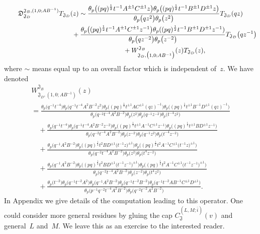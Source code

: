 \documentclass[a4paper,12pt]{article}
\begin{document}
\begin{gather}
{\mathfrak D}_{{\mathfrak J}_D}^{{\mathfrak J}_B,(1,0;AB^{-1})} T_{{\mathfrak J}_D}(z) \sim
\frac{\theta_p\big((pq)^\frac{1}{2}t^{-1}A^{\pm1}C^{\pm1}z\big)\theta_p\big((pq)^\frac{1}{2}t^{-1}B^{\pm1}D^{\pm1}z\big)}{\theta_p\big(q z^2\big)\theta_p\big(z^2\big)} T_{{\mathfrak J}_D}(qz)\nonumber\\
\hphantom{{\mathfrak D}_{{\mathfrak J}_D}^{{\mathfrak J}_B,(1,0;AB^{-1})} T_{{\mathfrak J}_D}(z) \sim}{}
 +\frac{\theta_p\big((pq)^\frac{1}{2}t^{-1}A^{\pm1}C^{\pm1}z^{-1}\big)\theta_p((pq)^\frac{1}{2}t^{-1}B^{\pm1}D^{\pm1}z^{-1})}{\theta_p\big(q z^{-2}\big)\theta_p\big(z^{-2}\big)} T_{{\mathfrak J}_D}\big(qz^{-1}\big)\nonumber\\
\hphantom{{\mathfrak D}_{{\mathfrak J}_D}^{{\mathfrak J}_B,(1,0;AB^{-1})} T_{{\mathfrak J}_D}(z) \sim}{}
+ W^{{\mathfrak J}_B}_{{\mathfrak J}_D,\big(1,0;AB^{-1}\big)}(z) T_{{\mathfrak J}_D}(z) ,
\end{gather}
where $\sim$ means equal up to an overall factor which is independent of~$z$. We have denoted
\begin{gather*}
W^{{\mathfrak J}_B}_{{\mathfrak J}_D, (1,0; AB^{-1})}(z)
\\=\frac{\theta_p\big(q^{-1}t^{-4}\big)\theta_p\big(q^{-1}t^{-4}A^2B^{-2}z^2\big)\theta_p\big((pq)^\frac{1}{2}t^{\pm1}A C^{\pm1}(qz)^{-1}\big)\theta_p\big((pq)^\frac{1}{2}t^{\pm1}B^{-1}D^{\pm1}(qz)^{-1}\big)}
{\theta_p\big(q^{-2}t^{-4}A^2B^{-2}\big)\theta_p\big(z^2\big)\theta_p\big(q^{-1}z^{-2}\big)\theta_p\big(t^{-4}z^2\big)}\\
\quad{} +\frac{\theta_p\big(q^{-1}t^{-4}\big)\theta_p\big(q^{-1}t^{-4}A^2B^{-2}z^{-2}\big)\theta_p\big((pq)^\frac{1}{2}t^{\pm1}A^{-1} C^{\pm1}z^{-1}\big)\theta_p\big((pq)^\frac{1}{2}t^{\pm1}BD^{\pm1}z^{-1}\big)}
{\theta_p\big(q^{-2}t^{-4}A^2B^{-2}\big)\theta_p\big(z^{-2}\big)\theta_p\big(q^{-1}z^{2}\big)\theta_p\big(t^{-4}z^{-2}\big)}\\
\quad{} +\frac{\theta_p\big(q^{-1}A^2B^{-2}\big)\theta_p\big((pq)^\frac{1}{2}t^{2}B D^{\pm1}\big(t^{-1}z\big)^{\pm1}\big)
\theta_p\big((pq)^\frac{1}{2}t^{2}A^{-1} C^{\pm1} \big(t^{-1} z\big)^{\pm1}\big)}
{\theta_p\big(q^{-2}t^{-4}A^2B^{-2}\big)\theta_p\big(z^2\big)\theta_p\big(t^4z^{-2}\big)} \\
\quad{}+\frac{\theta_p\big(q^{-1}A^2B^{-2}\big)\theta_p\big((pq)^\frac{1}{2}t^{2}B D^{\pm1}\big(t^{-1}z^{-1}\big)^{\pm1}\big)
\theta_p\big((pq)^\frac{1}{2}t^{2}A^{-1} C^{\pm1} \big(t^{-1} z^{-1}\big)^{\pm1}\big)}
{\theta_p\big(q^{-2}t^{-4}A^2B^{-2}\big)\theta_p\big(z^{-2}\big)\theta_p\big(t^4z^2\big)}\\
\quad{} +\frac{\theta_p\big(t^{-2}\big)\theta_p\big(q^{-1}t^{-2}A^2\big)\theta_p\big(q^{-1}A^2B^{-2}\big)\theta_p\big(q^{-1}t^{-2}B^{-2}\big) \theta_p\big(q^{-1}t^{-2}A B^{-1} C^{\pm1} D^{\pm1}\big)}{\theta_p\big(p^{-1}q^{-2}t^{-4}A^2 B^{-2}\big)\theta_p\big(q^{-2}t^{-2}A^2B^{-2}\big)}.
\end{gather*}
In Appendix we give details of the computation leading to this operator. One could consider more general residues by gluing the cap $C^{(L,M;\overline i)}_{{\mathfrak J}}(v)$ and general~$L$ and~$M$. We leave this as an exercise to the interested reader.
\end{document}

